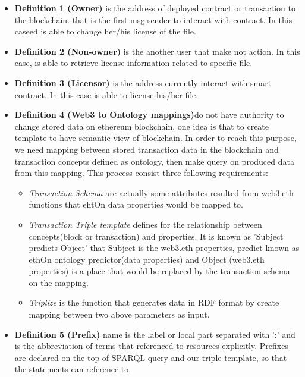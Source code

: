 \begin{itemize}
	\item \textbf{Definition 1 (Owner)} is the address of deployed contract or transaction to the blockchain. that is the first msg sender to interact with contract. In this caseed is able to change her/his license of the file.\\
	\item \textbf{Definition 2 (Non-owner)} is the another user that make not action. In this case, is able to retrieve license information related to specific file.\\
	\item \textbf{Definition 3 (Licensor)}  is the address currently interact with smart contract. In this case is able to license his/her file.\\ 
	\item \textbf{Definition 4 (Web3 to Ontology mappings)}do not have authority to change stored data on ethereum blockchain, one idea is that to create template to have semantic view of blockchain.
	In order to reach this purpose, we need mapping between stored transaction data in the blockchain and transaction concepts defined as ontology, then make query on produced data from this mapping. This process consist three following requirements:
	
	\begin{itemize}
		\item \textit{Transaction Schema} are actually some attributes resulted from web3.eth functions that ehtOn data properties would be mapped to.
		\item \textit{Transaction Triple template} defines for the relationship between concepts(block or transaction) and properties. It is known as 'Subject predicts Object' that Subject is the web3.eth properties, predict known as ethOn ontology predictor(data properties) and Object (web3.eth properties) is a place that would be replaced by the transaction schema on the mapping. 
		\item \textit{Triplize} is the function that generates data in RDF format by create mapping between two above parameters as input. 
	\end{itemize} 
     \item \textbf{Definition 5 (Prefix)} name is the label or local part separated with ':' and is the abbreviation of terms that referenced to resources explicitly. Prefixes are declared on the top of SPARQL query and our triple template, so that the statements can reference to.  
\end{itemize}
